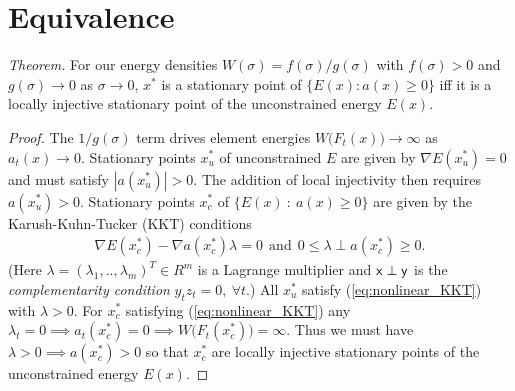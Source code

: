 \appendix

\section{Equivalence}
\label{sec:TH}

{\it Theorem.} For our energy densities $W(\sigma) = {f(\sigma)}/{g(\sigma)}$ with $f(\sigma)>0$ and $g(\sigma)\rightarrow 0$ as $\sigma\rightarrow 0$,
        $x^*$ is a stationary point of $\{E(x)   :   a(x) \geq 0 \}$ iff it is a locally injective stationary point of the unconstrained energy $E(x)$.

%
\begin{proof}
The $1/g(\sigma)$ term drives element energies $W\big(F_t(x)\big) \rightarrow \infty$ as $a_t(x) \rightarrow 0$. 
%
Stationary points $x_u^*$ of unconstrained $E$ are given by $\nabla E(x_u^*) = 0$ and must satisfy $|a(x_u^*)| > 0$. The addition of local injectivity then requires $a(x_u^*) > 0$.
%
Stationary points $x_c^*$ of $\{E(x) \>  : \>  a(x) \geq 0 \}$ are given by the Karush-Kuhn-Tucker (KKT) conditions
\begin{align}
\label{eq:nonlinear_KKT}
\nabla E(x_c^*) - \nabla a(x_c^*) \lambda = 0 \> \> \text{and} \> \> 
0 \leq \lambda \perp  a(x_c^*) \geq 0.
\end{align}
(Here $\lambda = (\lambda_1, .. ,\lambda_m)^T \in R^m$ is a Lagrange multiplier and $\mbox{\textbf{{$\mathsf x$}}} \perp \mbox{\textbf{{$\mathsf y$}}}$ is the \emph{complementarity condition} $y_t z_t = 0,\ \forall t$.)
All $x_u^*$ satisfy (\ref{eq:nonlinear_KKT}) with $\lambda > 0$. For $x_c^*$ satisfying (\ref{eq:nonlinear_KKT}) any $\lambda_t = 0 \implies a_t(x_c^*) = 0\implies W \big(F_t(x_c^*)\big)  = \infty$. Thus we must have  $\lambda > 0 \implies  a(x_c^*) > 0$ so that $x_c^*$ are locally injective stationary points of the unconstrained energy $E(x)$.
\end{proof}